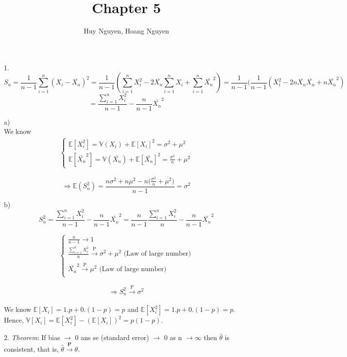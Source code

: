\documentclass[10pt]{article}
\newenvironment{problem}[2][Problem]{\begin{trivlist}
\item[\hskip \labelsep {\bfseries #1}\hskip \labelsep {\bfseries #2.}]}{\end{trivlist}}
\begin{document}
\title{Chapter 5}
\author{Huy Nguyen, Hoang Nguyen}
\maketitle
    
\begin{problem}{1}

\item 1.
\[S_n=\frac{1}{n-1}\sum_{i=1}^{n}(X_i-\bar{X_n})^2=\frac{1}{n-1}(\sum_{i=1}^{n} X_{i}^2- 2\bar{X_n}\sum_{i=1}^{n}X_i+ \sum_{i=1}^{n}\bar{X_n}^2)=\frac{1}{n-1}(\frac{1}{n-1}(X_{i}^2- 2n\bar{X_n}\bar{X_n}+n\bar{X_n}^2)\]
\[=\frac{\sum_{i=1}^{n}X_i^2}{n-1}- \frac{n}{n-1}\bar{X_n}^2\]

a) \\

We know
\begin{align}
    \begin{cases}
        \mathbb{E}[X_i^2]= \mathbb{V}(X_i) + \mathbb{E}[X_i]^2= \sigma^2 + \mu^2 \\
        \mathbb{E}[\bar{X_n}^2]= \mathbb{V}(\bar{X_n}) + \mathbb{E}[\bar{X_n}]^2= \frac{\sigma^2}{n}  + \mu^2
    \end{cases}
\end{align}

\[\Rightarrow \mathbb{E}(S_n^2)=\frac{n\sigma^2 + n\mu^2-n\big(\frac{\sigma^2}{n}  + \mu^2 \big)}{n-1}= \sigma^2\]

b) \\

\[S_n^2=\frac{\sum_{i=1}^{n}X_i^2}{n-1}- \frac{n}{n-1}\bar{X_n}^2=\frac{n}{n-1} \frac{\sum_{i=1}^{n}X_i^2}{n}- \frac{n}{n-1}\bar{X_n}^2\]

\begin{align}
    \begin{cases}
        \frac{n}{n-1} \rightarrow 1 \\
        \frac{\sum_{i=1}^{n}X_i^2}{n} \xrightarrow[]{\text{P}} \sigma^2+\mu^2 \text{ (Law of large number)}\\
        \bar{X_n}^2 \xrightarrow[]{\text{P}} \mu^2 \text{ (Law of large number)}
    \end{cases}
\end{align}

\[\Rightarrow S_n^2 \xrightarrow[]{\text{P}} \sigma^2\]


We know $\mathbb{E}[X_i]=1.p+ 0.(1-p)=p$ and $\mathbb{E}[X_i^2]=1.p+ 0.(1-p)=p$. Hence, $\mathbb{V}[X_i]= \mathbb{E}[X_i^2]- (\mathbb{E}[X_i])^2 =p(1-p).$
\item 2. \textit{Theorem}: If bias $\rightarrow$ 0 ans se (standard error) $\rightarrow$ 0 as n $\rightarrow \infty$ then $\hat{\theta}$ is consistent, that is, $\hat{\theta} \xrightarrow{\textbf{P}} \theta$.\\





\end{problem}
\end{document}

